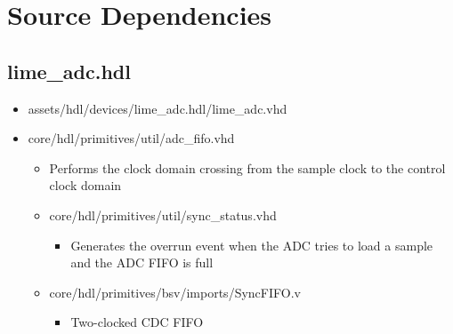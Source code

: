 \documentclass{article}
\def\comp{lime\_adc}
\begin{document}
\section*{Source Dependencies}
\subsection*{\comp.hdl}
\begin{itemize}
	\item assets/hdl/devices/lime\_adc.hdl/lime\_adc.vhd
	\item core/hdl/primitives/util/adc\_fifo.vhd
    \begin{itemize}
    		\item Performs the clock domain crossing from the sample clock to the control clock domain
    \end{itemize}
	\begin{itemize}
		\item core/hdl/primitives/util/sync\_status.vhd
	    \begin{itemize}
    			\item Generates the overrun event when the ADC tries to load a	sample and the ADC FIFO is full
		\end{itemize}
		\item core/hdl/primitives/bsv/imports/SyncFIFO.v
    		\begin{itemize}
		    	\item Two-clocked CDC FIFO
	    \end{itemize}
	\end{itemize}

\end{itemize}
\end{document}
